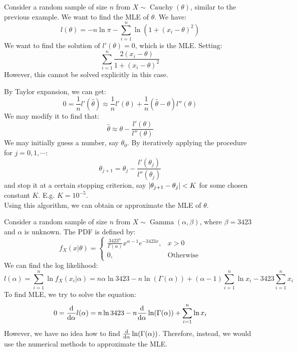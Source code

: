 \documentclass{huhtakm-template-book-v2}
\DeclareMathOperator{\Cauchy}{Cauchy}
\DeclareMathOperator{\Gam}{Gamma}
\begin{document}
\newpage
\begin{eg}
	Consider a random sample of size $n$ from $X\sim\Cauchy(\theta)$, similar to the previous example. We want to find the MLE of $\theta$. We have:
	\begin{equation*}
		l(\theta)=-n\ln{\pi}-\sum_{i=1}^{n}\ln(1+(x_{i}-\theta)^{2})
	\end{equation*}
	We want to find the solution of $l'(\theta)=0$, which is the MLE. Setting:
	\begin{equation*}
		\sum_{i=1}^{n}\frac{2(x_{i}-\theta)}{1+(x_{i}-\theta)^{2}}
	\end{equation*}
	However, this cannot be solved explicitly in this case.
\end{eg}
\begin{eg}
	By Taylor expansion, we can get:
	\begin{equation*}
		0=\frac{1}{n}l'(\hat{\theta})\approx\frac{1}{n}l'(\theta)+\frac{1}{n}(\hat{\theta}-\theta)l''(\theta)
	\end{equation*}
	We may modify it to find that:
	\begin{equation*}
		\hat{\theta}\approx\theta-\frac{l'(\theta)}{l''(\theta)}
	\end{equation*}
	We may initially guess a number, say $\theta_{0}$. By iteratively applying the procedure for $j=0,1,\cdots$:
	\begin{equation*}
		\theta_{j+1}=\theta_{j}-\frac{l'(\theta_{j})}{l''(\theta_{j})}
	\end{equation*}
	and stop it at a certain stopping criterion, say $\left|{\theta_{j+1}-\theta_{j}}\right|<K$ for some chosen constant $K$. E.g. $K=10^{-5}$.\\
	Using this algorithm, we can obtain or approximate the MLE of $\theta$.
\end{eg}
\begin{eg}
	Consider a random sample of size $n$ from $X\sim\Gam(\alpha,\beta)$, where $\beta=3423$ and $\alpha$ is unknown. The PDF is defined by:
	\begin{equation*}
		f_{X}(x|\theta)=\begin{cases}
			\frac{3423^{\alpha}}{\Gamma(\alpha)}x^{\alpha-1}e^{-3423x}, &x>0\\
			0, &\text{Otherwise}
		\end{cases}
	\end{equation*}
	We can find the log likelihood:
	\begin{equation*}
		l(\alpha)=\sum_{i=1}^{n}\ln{f_{X}(x_{i}|\alpha)}=n\alpha\ln{3423}-n\ln(\Gamma(\alpha))+(\alpha-1)\sum_{i=1}^{n}\ln{x_{i}}-3423\sum_{i=1}^{n}x_{i}
	\end{equation*}
	To find MLE, we try to solve the equation:
	\begin{equation*}
		0=\odv*{}{\alpha}l(\alpha)=n\ln{3423}-n\odv*{}{\alpha}\ln(\Gamma(\alpha))+\sum_{i=1}^{n}\ln{x_{i}}
	\end{equation*}
	However, we have no idea how to find $\odv*{}{\alpha}\ln(\Gamma(\alpha))$. Therefore, instead, we would use the numerical methods to approximate the MLE.
\end{eg}
\end{document}
